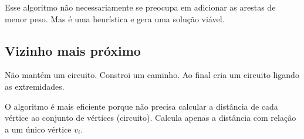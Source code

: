 \begin{algorithm}
    \SetAlgoLined
\end{algorithm}

Esse algoritmo não necessariamente se preocupa em adicionar as arestas de menor peso. Mas é uma heurística e gera uma solução viável.

\subsection{Vizinho mais próximo}

Não mantém um circuito. Constroi um caminho. Ao final cria um circuito ligando as extremidades.

\begin{algorithm}
    \SetAlgoLined
\end{algorithm}

O algoritmo \TSPquatro é mais eficiente porque não precisa calcular a distância de cada vértice ao conjunto de vértices (circuito). Calcula apenas a distância com relação a um único vértice $v_i$.
